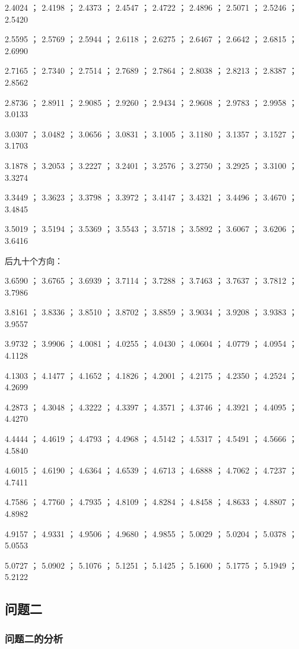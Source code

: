 \documentclass[UTF8]{ctexart}
\begin{document}
2.4024 ； 2.4198 ； 2.4373 ； 2.4547 ； 2.4722 ； 2.4896 ； 2.5071 ； 2.5246 ； 2.5420

2.5595 ； 2.5769 ； 2.5944 ； 2.6118 ； 2.6275 ； 2.6467 ； 2.6642 ； 2.6815 ； 2.6990

2.7165 ； 2.7340 ； 2.7514 ； 2.7689 ； 2.7864 ； 2.8038 ； 2.8213 ； 2.8387 ； 2.8562

2.8736 ； 2.8911 ； 2.9085 ； 2.9260 ； 2.9434 ； 2.9608 ； 2.9783 ； 2.9958 ； 3.0133

3.0307 ； 3.0482 ； 3.0656 ； 3.0831 ； 3.1005 ； 3.1180 ； 3.1357 ； 3.1527 ； 3.1703

3.1878 ； 3.2053 ； 3.2227 ； 3.2401 ； 3.2576 ； 3.2750 ； 3.2925 ； 3.3100 ； 3.3274

3.3449 ； 3.3623 ； 3.3798 ； 3.3972 ； 3.4147 ； 3.4321 ； 3.4496 ； 3.4670 ； 3.4845

3.5019 ； 3.5194 ； 3.5369 ； 3.5543 ； 3.5718 ； 3.5892 ； 3.6067 ； 3.6206 ； 3.6416

后九十个方向：

3.6590 ； 3.6765 ； 3.6939 ； 3.7114 ； 3.7288 ； 3.7463 ； 3.7637 ； 3.7812 ； 3.7986

3.8161 ； 3.8336 ； 3.8510 ； 3.8702 ； 3.8859 ； 3.9034 ； 3.9208 ； 3.9383 ； 3.9557

3.9732 ； 3.9906 ； 4.0081 ； 4.0255 ； 4.0430 ； 4.0604 ； 4.0779 ； 4.0954 ； 4.1128

4.1303 ； 4.1477 ； 4.1652 ； 4.1826 ； 4.2001 ； 4.2175 ； 4.2350 ； 4.2524 ； 4.2699

4.2873 ； 4.3048 ； 4.3222 ； 4.3397 ； 4.3571 ； 4.3746 ； 4.3921 ； 4.4095 ； 4.4270

4.4444 ； 4.4619 ； 4.4793 ； 4.4968 ； 4.5142 ； 4.5317 ； 4.5491 ； 4.5666 ； 4.5840

4.6015 ； 4.6190 ； 4.6364 ； 4.6539 ； 4.6713 ； 4.6888 ； 4.7062 ； 4.7237 ； 4.7411

4.7586 ； 4.7760 ； 4.7935 ； 4.8109 ； 4.8284 ； 4.8458 ； 4.8633 ； 4.8807 ； 4.8982

4.9157 ； 4.9331 ； 4.9506 ； 4.9680 ； 4.9855 ； 5.0029 ； 5.0204 ； 5.0378 ； 5.0553

5.0727 ； 5.0902 ； 5.1076 ； 5.1251 ； 5.1425 ； 5.1600 ； 5.1775 ； 5.1949 ； 5.2122



\subsection{问题二}
\subsubsection{问题二的分析}
\end{document}
